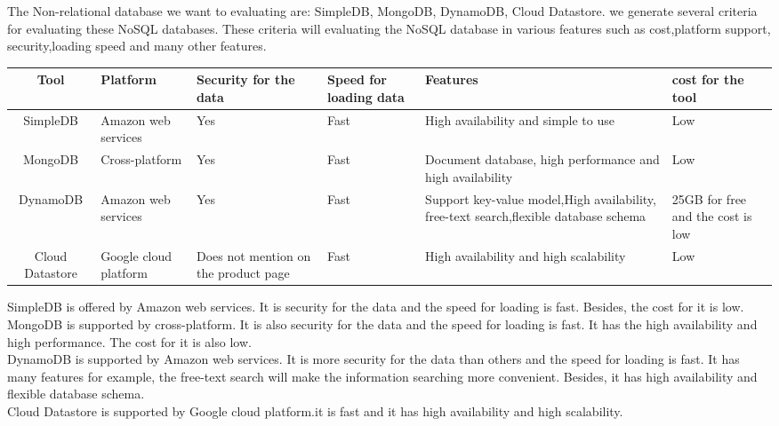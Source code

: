 \documentclass[10pt,draftclsnofoot,onecolumn,journal,compsoc]{IEEEtran}
\begin{document}
	    \noindent The Non-relational database we want to evaluating are: SimpleDB, MongoDB, DynamoDB, Cloud Datastore. we generate several criteria for evaluating these NoSQL databases. These criteria will evaluating the NoSQL database in various features such as cost,platform support, security,loading speed and many other features.
        \\
        \begin{longtable}{|c|p{2cm}|p{2cm}|p{1cm}|p{5cm}|p{3cm}|}
            \hline
            \textbf{Tool} & \textbf{Platform} & \textbf{Security for the data} & \textbf{Speed for loading data} & \textbf{Features} & \textbf{cost for the tool}\\
            \hline
            SimpleDB & Amazon web services & Yes & Fast & High availability and simple to use & Low \\
            \hline
            MongoDB & Cross-platform & Yes & Fast & Document database, high performance and high availability & Low \\
            \hline
            DynamoDB & Amazon web services & Yes & Fast & Support key-value model,High availability, free-text search,flexible database schema & 25GB for free and the cost is low\\
            \hline
             Cloud Datastore & Google cloud platform & Does not mention on the product page & Fast & High availability and high scalability & Low\\
            \hline
        \end{longtable}
 
 	    \noindent SimpleDB is offered by Amazon web services. It is security for the data and the speed for loading is fast. Besides, the cost for it is low.\\

        \noindent MongoDB is supported by cross-platform. It is also security for the data and the speed for loading is fast. It has the high availability and high performance. The cost for it is also low.\\

        \noindent DynamoDB is supported by Amazon web services. It is more security for the data than others and the speed for loading is fast. It has many features for example, the free-text search will make the information searching more convenient\cite{W5}. Besides, it has high availability and flexible database schema.\\

        \noindent Cloud Datastore is supported by Google cloud platform.it is fast and it has high availability and high scalability.\\
\end{document}
